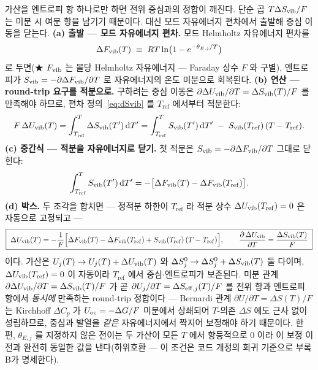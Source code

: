 가산을 엔트로피 항 하나로만 하면 전위 중심과의 정합이 깨진다. 단순 곱 $T\Delta S_{\mathrm{vib}}/F$ 는 미분 시 여분
항을 남기기 때문이다. 대신 모드 자유에너지 편차에서 출발해 중심 이동을 닫는다.
\textbf{(a) 출발 --- 모드 자유에너지 편차.} 모드 Helmholtz 자유에너지 편차를
\[
\Delta F_{\mathrm{vib}}(T)\;\equiv\; RT\ln\bigl(1-e^{-\theta_{E,j}/T}\bigr)
\]
로 두면(★ $F_{\mathrm{vib}}$ 는 몰당 Helmholtz 자유에너지 --- Faraday 상수 $F$ 와 구별), 엔트로피가 $S_{\mathrm{vib}}=-\partial
\Delta F_{\mathrm{vib}}/\partial T$ 로 자유에너지의 온도 미분으로 회복된다. \textbf{(b) 연산 --- round-trip 요구를
적분으로.} 구하려는 중심 이동은 $\partial\Delta U_{\mathrm{vib}}/\partial T=\Delta S_{\mathrm{vib}}(T)/F$ 를 만족해야 하므로,
편차 정의~\eqref{eq:dSvib} 를 $T_\mathrm{ref}$ 에서부터 적분한다:
\[
F\,\Delta U_{\mathrm{vib}}(T)=\int_{T_\mathrm{ref}}^{T}\Delta S_{\mathrm{vib}}(T')\,\mathrm{d} T'
=\int_{T_\mathrm{ref}}^{T}S_{\mathrm{vib}}(T')\,\mathrm{d} T'\;-\;S_{\mathrm{vib}}(T_\mathrm{ref})\,(T-T_\mathrm{ref}).
\]
\textbf{(c) 중간식 --- 적분을 자유에너지로 닫기.} 첫 적분은 $S_{\mathrm{vib}}=-\partial\Delta F_{\mathrm{vib}}/\partial T$
그대로 닫힌다:
\[
\int_{T_\mathrm{ref}}^{T}S_{\mathrm{vib}}(T')\,\mathrm{d} T'
=-\bigl[\Delta F_{\mathrm{vib}}(T)-\Delta F_{\mathrm{vib}}(T_\mathrm{ref})\bigr].
\]
\textbf{(d) 박스.} 두 조각을 합치면 --- 정적분 하한이 $T_\mathrm{ref}$ 라 적분 상수
$\Delta U_{\mathrm{vib}}(T_\mathrm{ref})=0$ 은 자동으로 고정되고 ---
\begin{equation}
\boxed{\;
\Delta U_{\mathrm{vib}}(T)=-\frac1F\Bigl[\Delta F_{\mathrm{vib}}(T)-\Delta F_{\mathrm{vib}}(T_\mathrm{ref})+S_{\mathrm{vib}}(T_\mathrm{ref})\,(T-T_\mathrm{ref})\Bigr],
\qquad
\frac{\partial\,\Delta U_{\mathrm{vib}}}{\partial T}=\frac{\Delta S_{\mathrm{vib}}(T)}{F}\;}
\label{eq:dUvib}
\end{equation}
이다. 가산은 $U_j(T)\to U_j(T)+\Delta U_{\mathrm{vib}}(T)$ 와 $\Delta S^0_j\to\Delta S^0_j+\Delta S_{\mathrm{vib}}(T)$ 둘 다이며,
$\Delta U_{\mathrm{vib}}(T_\mathrm{ref})=0$ 이 자동이라 $T_\mathrm{ref}$ 에서 중심$\cdot$엔트로피가 보존된다. 미분 관계
$\partial\Delta U_{\mathrm{vib}}/\partial T=\Delta S_{\mathrm{vib}}(T)/F$ 가 곧 $\partial U_j/\partial T=\Delta S_{\mathrm{eff},j}(T)/F$ 를 전위
항과 엔트로피 항에서 \emph{동시에} 만족하는 round-trip 정합이다 --- Bernardi 관계 $\partial U/\partial
T=\Delta S(T)/F$ 는 Kirchhoff $\Delta C_p$ 가 $U_{\mathrm{oc}}={-}\Delta G/F$ 미분에서 상쇄되어 $T$-의존 $\Delta S$ 에도
근사 없이 성립하므로, 중심과 발열을 \emph{같은} 자유에너지에서 짝지어 보정해야 하기 때문이다. 한편,
$\theta_{E,j}$ 를 지정하지 않은 전이는 두 가산이 모든 $T$ 에서 항등적으로 $0$ 이라 이 보정 이전과 완전히
동일한 값을 낸다(하위호환 --- 이 조건은 코드 개정의 회귀 기준으로 부록 B가 명세한다).

